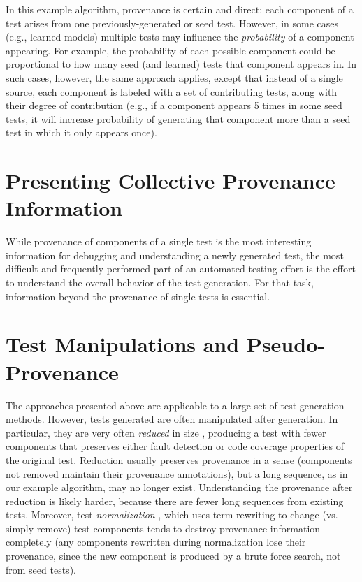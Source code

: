 \documentclass[final]{article}
\begin{document}
In this example algorithm, provenance is certain and direct:  each component of a
test arises from one previously-generated or seed test.  However, in
some cases (e.g., learned models) multiple tests may influence the
\emph{probability} of a component appearing.  For example, the
probability of each possible component could be proportional to how
many seed (and learned) tests that component appears in.  In such cases,
however, the same approach applies, except that instead of a single
source, each component is labeled with a set of contributing tests,
along with their degree of contribution (e.g., if a component appears
5 times in some seed tests, it will increase probability of generating
that component more than a seed test in which it only appears once).

\section{Presenting Collective Provenance Information}

While provenance of components of a single test is the most
interesting information for debugging and understanding a newly
generated test, the most difficult and frequently performed part of an
automated testing effort is the effort to understand the overall
behavior of the test generation.  For that task, information beyond
the provenance of single tests is essential.

\section{Test Manipulations and Pseudo-Provenance}

The approaches presented above are applicable to a large set of test
generation methods.  However, tests generated are often manipulated
after generation.  In particular, they are very often \emph{reduced}
in size \cite{DD}, producing a test with fewer components that
preserves either fault detection or code coverage \cite{icst2014}
properties of the original test.  Reduction usually preserves
provenance in a sense (components not removed maintain their
provenance annotations), but a long sequence, as in our example
algorithm, may no longer exist.  Understanding the provenance after
reduction is likely harder, because there are fewer long sequences
from existing tests.  Moreover, test \emph{normalization} \cite{Groce:2017:OTR:3092703.3092704}, which uses
term rewriting to change (vs. simply remove) test components tends to
destroy provenance information completely (any components rewritten
during normalization
lose their provenance, since the new component is produced by a brute
force search, not from seed tests).
\end{document}
